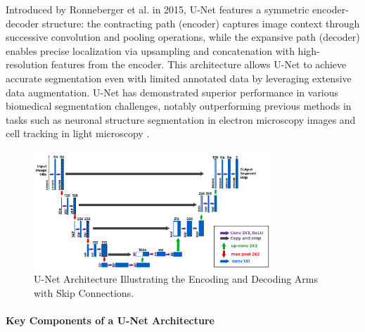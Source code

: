 Introduced by Ronneberger et al. in 2015, U-Net features a symmetric encoder-decoder structure: the contracting path (encoder) captures image context through successive convolution and pooling operations, while the expansive path (decoder) enables precise localization via upsampling and concatenation with high-resolution features from the encoder. This architecture allows U-Net to achieve accurate segmentation even with limited annotated data by leveraging extensive data augmentation. U-Net has demonstrated superior performance in various biomedical segmentation challenges, notably outperforming previous methods in tasks such as neuronal structure segmentation in electron microscopy images and cell tracking in light microscopy \cite{ronneberger2015u}.
\begin{figure}[H]
  \centering
  \includegraphics[width=0.8\textwidth]{Images/Chapter1/unet.png}
  \caption{U-Net Architecture Illustrating the Encoding and Decoding Arms with Skip Connections. \cite{ronneberger2015u}}
  \label{fig:unet}
\end{figure}

\paragraph*{Key Components of a U-Net Architecture}

